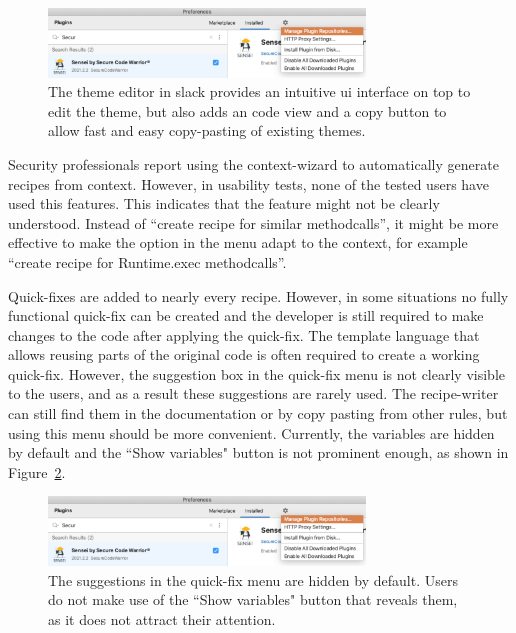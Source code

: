 \begin{figure}
  \centering
  \includegraphics[width=0.75\textwidth,page=16]{04-tools/figures/figures2.pdf}
  
  \caption[Slack theme editor]{The theme editor in slack provides an intuitive \gls{ui} interface on top to edit the theme, but also adds an code view and a copy button to allow fast and easy copy-pasting of existing themes.}
  \label{fig:slacktheme} 
\end{figure}

Security professionals report using the context-wizard to automatically generate recipes from context.
However, in usability tests, none of the tested users have used this features.
This indicates that the feature might not be clearly understood.
Instead of “create recipe for similar methodcalls”, it might be more effective to make the option in the menu adapt to the context, for example “create recipe for Runtime.exec methodcalls”.

Quick-fixes are added to nearly every recipe.
However, in some situations no fully functional quick-fix can be created and the developer is still required to make changes to the code after applying the quick-fix.
The template language that allows reusing parts of the original code is often required to create a working quick-fix.
However, the suggestion box in the quick-fix menu is not clearly visible to the users, and as a result these suggestions are rarely used.
The recipe-writer can still find them in the documentation or by copy pasting from other rules, but using this menu should be more convenient.
Currently, the variables are hidden by default and the ``Show variables" button is not prominent enough, as shown in Figure~\ref{fig:showvariables}.

\begin{figure}
  \centering
  \includegraphics[width=0.75\textwidth,page=15]{04-tools/figures/figures2.pdf}
  \caption[Show variables button in the fix menu]{The suggestions in the quick-fix menu are hidden by default. Users do not make use of the ``Show variables" button that reveals them, as it does not attract their attention.}
  \label{fig:showvariables} 
\end{figure}

